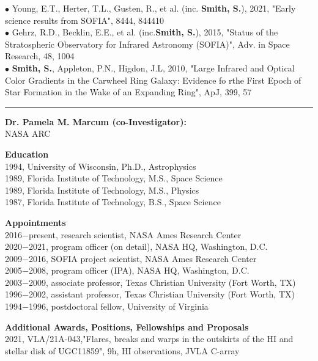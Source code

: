 {\scriptsize{$\bullet$}} Young, E.T., Herter, T.L., Gusten, R., et al. (inc. \textbf{Smith, S.}), 2021, "Early science results from SOFIA", 8444, 844410\\
{\scriptsize{$\bullet$}} Gehrz, R.D., Becklin, E.E., et al. (inc.\textbf{Smith, S.}), 2015, "Status of the Stratospheric Observatory for Infrared Astronomy (SOFIA)", Adv. in Space Research, 48, 1004\\
{\scriptsize{$\bullet$}} \textbf{Smith, S.}, Appleton, P.N., Higdon, J.L, 2010, "Large Infrared and Optical Color Gradients in the Carwheel Ring Galaxy: Evidence fo rthe First Epoch of Star Formation in the Wake of an Expanding Ring", ApJ, 399, 57
\medskip \hrule \vspace{5pt} \medskip
\textbf{\color{Blue}\large Dr. Pamela M. Marcum (co-Investigator):}\\
NASA ARC
\par \vspace{-0.5em}
\textbf{Education}\\
1994, University of Wisconsin, Ph.D., Astrophysics\\
1989, Florida Institute of Technology, M.S., Space Science\\
1989, Florida Institute of Technology, M.S., Physics\\
1987, Florida Institute of Technology, B.S., Space Science
\par \vspace{-0.5em}
\textbf{Appointments}\\
2016$-$present, research scientist, NASA Ames Research Center\\
2020$-$2021, program officer (on detail), NASA HQ, Washington, D.C.\\
2009$-$2016, SOFIA project scientist, NASA Ames Research Center\\
2005$-$2008, program officer (IPA), NASA HQ, Washington, D.C.\\
2003$-$2009, associate professor, Texas Christian University (Fort Worth, TX)\\
1996$-$2002, assistant professor, Texas Christian University (Fort Worth, TX)\\
1994$-$1996, postdoctoral fellow, University of Virginia
\par \vspace{-0.5em}
\textbf{Additional Awards, Positions, Fellowships and Proposals}\\
2021, VLA/21A-043,"Flares, breaks and warps in the outskirts of the HI and stellar disk of UGC11859", 9h, HI observations, JVLA C-array\\
